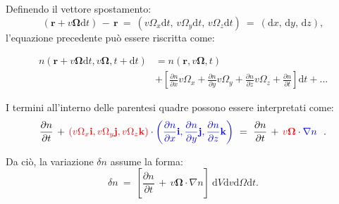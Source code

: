 Definendo il vettore spostamento:
\begin{equation}
	\left(\mathbf{r} + v \boldsymbol{\Omega} \mathrm{d} t\right)\, -\, \mathbf{r}\ =\ \left(v \Omega_x \mathrm{d} t,\, v \Omega_y \mathrm{d} t,\, v \Omega_z \mathrm{d} t\right)\ =\ (\mathrm{d} x,\, \mathrm{d} y,\, \mathrm{d} z),
\end{equation}
l'equazione precedente può essere riscritta come:

\begin{equation}
	\begin{aligned}
		n (\mathbf{r} + v \boldsymbol{\Omega} \mathrm{d} t, v \boldsymbol{\Omega}, t + \mathrm{d} t) &= n (\mathbf{r}, v \boldsymbol{\Omega}, t) \\
		&+ \left[ \frac{\partial n}{\partial x} v \Omega_x + \frac{\partial n}{\partial y} v \Omega_y + \frac{\partial n}{\partial z} v \Omega_z + \frac{\partial n}{\partial t} \right] \mathrm{d} t + \dots
	\end{aligned}
\end{equation}

I termini all'interno delle parentesi quadre possono essere interpretati come:
\begin{equation}
	\frac{\partial n}{\partial t}\, +\, 
	\textcolor{red}{\left(v \Omega_x \mathbf{i}, v \Omega_y \mathbf{j}, v \Omega_z \mathbf{k}\right)} \cdot \textcolor{blue}{\left(\frac{\partial n}{\partial x} \mathbf{i}, \frac{\partial n}{\partial y} \mathbf{j}, \frac{\partial n}{\partial z} \mathbf{k}\right)}\ =\ \frac{\partial n}{\partial t}\, +\, \textcolor{red}{v \boldsymbol{\Omega}} \cdot \textcolor{blue}{\nabla n}\ \ .
\end{equation}

Da ciò, la variazione $\delta n$ assume la forma:
\begin{equation}
	\delta n\ =\ \left[ \frac{\partial n}{\partial t}\, +\, v \boldsymbol{\Omega} \cdot \nabla n \right]\ \mathrm{d} V \mathrm{d} v \mathrm{d} \Omega \mathrm{d} t.
\end{equation}


